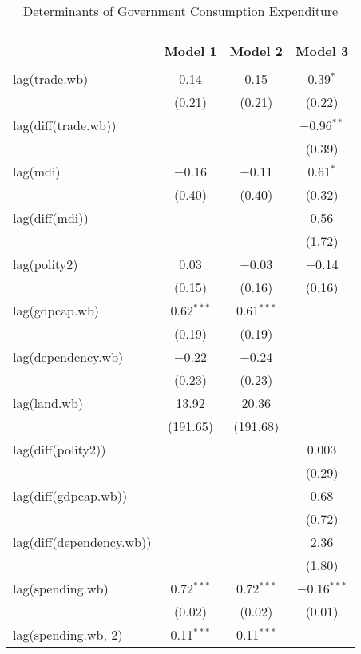 
\begin{table}[!htbp] \centering 
  \caption{Determinants of Government Consumption Expenditure} 
  \label{} 
\footnotesize 
\begin{tabular}{@{\extracolsep{5pt}}lccc} 
\\[-1.8ex]\hline \\[-1.8ex] 
\\[-1.8ex] & \textbf{Model 1} & \textbf{Model 2} & \textbf{Model 3}\\ 
\hline \\[-1.8ex] 
 lag(trade.wb) & 0.14 & 0.15 & 0.39$^{*}$ \\ 
  & (0.21) & (0.21) & (0.22) \\ 
  lag(diff(trade.wb)) &  &  & $-$0.96$^{**}$ \\ 
  &  &  & (0.39) \\ 
  lag(mdi) & $-$0.16 & $-$0.11 & 0.61$^{*}$ \\ 
  & (0.40) & (0.40) & (0.32) \\ 
  lag(diff(mdi)) &  &  & 0.56 \\ 
  &  &  & (1.72) \\ 
  lag(polity2) & 0.03 & $-$0.03 & $-$0.14 \\ 
  & (0.15) & (0.16) & (0.16) \\ 
  lag(gdpcap.wb) & 0.62$^{***}$ & 0.61$^{***}$ &  \\ 
  & (0.19) & (0.19) &  \\ 
  lag(dependency.wb) & $-$0.22 & $-$0.24 &  \\ 
  & (0.23) & (0.23) &  \\ 
  lag(land.wb) & 13.92 & 20.36 &  \\ 
  & (191.65) & (191.68) &  \\ 
  lag(diff(polity2)) &  &  & 0.003 \\ 
  &  &  & (0.29) \\ 
  lag(diff(gdpcap.wb)) &  &  & 0.68 \\ 
  &  &  & (0.72) \\ 
  lag(diff(dependency.wb)) &  &  & 2.36 \\ 
  &  &  & (1.80) \\ 
  lag(spending.wb) & 0.72$^{***}$ & 0.72$^{***}$ & $-$0.16$^{***}$ \\ 
  & (0.02) & (0.02) & (0.01) \\ 
  lag(spending.wb, 2) & 0.11$^{***}$ & 0.11$^{***}$ &  \\ 

\end{tabular}
\end{table}
